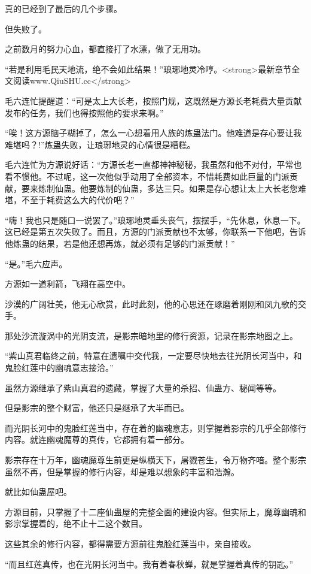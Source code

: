 \begin{this_body}
真的已经到了最后的几个步骤。

但失败了。

之前数月的努力心血，都直接打了水漂，做了无用功。

“若是利用毛民天地流，绝不会如此结果！”琅琊地灵冷哼。<strong>最新章节全文阅读www.QiuSHU.cc</strong>

毛六连忙提醒道：“可是太上大长老，按照门规，这既然是方源长老耗费大量贡献发布的任务，我们也得按照他的要求来啊。”

“唉！这方源脑子糊掉了，怎么一心想着用人族的炼蛊法门。他难道是存心要让我难堪吗？!”炼蛊失败，让琅琊地灵的心情很是糟糕。

毛六连忙为方源说好话：“方源长老一直都神神秘秘，我虽然和他不对付，平常也看不惯他。不过呢，这一次他似乎动用了全部资本，不惜耗费如此巨量的门派贡献，要来炼制仙蛊。他要炼制的仙蛊，多达三只。如果是存心想让太上大长老您难堪，不至于耗费这么大的代价吧？”

“嗨！我也只是随口一说罢了。”琅琊地灵垂头丧气，摆摆手，“先休息，休息一下。这已经是第五次失败了。而且，方源的门派贡献也不太够，你联系一下他吧，告诉他炼蛊的结果，若是他还想再炼，就必须有足够的门派贡献！”

“是。”毛六应声。

方源如一道利箭，飞翔在高空中。

沙漠的广阔壮美，他无心欣赏，此时此刻，他的心思还在琢磨着刚刚和凤九歌的交手。

那处沙流漩涡中的光阴支流，是影宗暗地里的修行资源，记录在影宗地图之上。

“紫山真君临终之前，特意在遗嘱中交代我，一定要尽快地去往光阴长河当中，和鬼脸红莲中的幽魂意志接洽。”

虽然方源继承了紫山真君的遗藏，掌握了大量的杀招、仙蛊方、秘闻等等。

但是影宗的整个财富，他还只是继承了大半而已。

而光阴长河中的鬼脸红莲当中，存在着的幽魂意志，则掌握着影宗的几乎全部修行内容。就连幽魂魔尊的真传，它都拥有着一部分。

影宗存在十万年，幽魂魔尊生前更是纵横天下，屠戮苍生，令万物齐喑。整个影宗虽然不再，但是掌握的修行内容，却是难以想象的丰富和浩瀚。

就比如仙蛊屋吧。

方源目前，只掌握了十二座仙蛊屋的完整全面的建设内容。但实际上，魔尊幽魂和影宗掌握着的，绝不止十二这个数目。

这些其余的修行内容，都得需要方源前往鬼脸红莲当中，亲自接收。

“而且红莲真传，也在光阴长河当中。我有着春秋蝉，就是掌握着真传的钥匙。”


\end{this_body}
